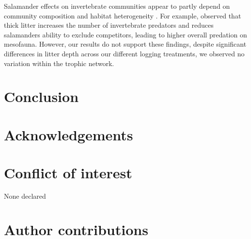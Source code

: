 Salamander effects on invertebrate communities appear to partly depend on community composition and habitat heterogeneity \citep{MichaelWalton2005Salamandersforestfloor,Walton2006Salamandersforestfloor,Walton2013Topdownregulation,Best2014trophicrole}. 
For example, \cite{Walton2013Topdownregulation} observed that thick litter increases the number of invertebrate predators and reduces salamanders ability to exclude competitors, leading to higher overall predation on mesofauna. 
However, our results do not support these findings, despite significant differences in litter depth across our different logging treatments, we observed no variation within the trophic network.


\section*{Conclusion}
\label{sec:conclu1}

\section*{Acknowledgements}
\label{sec:acknowl1}

\section*{Conflict of interest}
\label{sec:conflict1}

None declared
\section*{Author contributions}
\label{sec:author1}

\cleardoublepage

\begin{otherlanguage}{english}

\end{otherlanguage}
